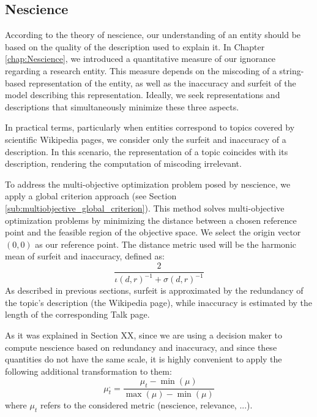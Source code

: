 \subsection{Nescience}

According to the theory of nescience, our understanding of an entity should be based on the quality of the description used to explain it. In Chapter \ref{chap:Nescience}, we introduced a quantitative measure of our ignorance regarding a research entity. This measure depends on the miscoding of a string-based representation of the entity, as well as the inaccuracy and surfeit of the model describing this representation. Ideally, we seek representations and descriptions that simultaneously minimize these three aspects.

In practical terms, particularly when entities correspond to topics covered by scientific Wikipedia pages, we consider only the surfeit and inaccuracy of a description. In this scenario, the representation of a topic coincides with its description, rendering the computation of miscoding irrelevant.

To address the multi-objective optimization problem posed by nescience, we apply a global criterion approach (see Section \ref{sub:multiobjective_global_criterion}). This method solves multi-objective optimization problems by minimizing the distance between a chosen reference point and the feasible region of the objective space. We select the origin vector $(0, 0)$ as our reference point. The distance metric used will be the harmonic mean of surfeit and inaccuracy, defined as:
\[
\frac{2}{ \iota(d, r)^{-1} + \sigma(d, r)^{-1} }
\]
As described in previous sections, surfeit is approximated by the redundancy of the topic's description (the Wikipedia page), while inaccuracy is estimated by the length of the corresponding Talk page.

As it was explained in Section {\color{red} XX}, since we are using a decision maker to compute nescience based on redundancy and inaccuracy, and since these quantities do not have the same scale, it is highly convenient to apply the following additional transformation to them:
\[
\mu_{t}^{,}=\frac{\mu_{t}-\min(\mu)}{\max(\mu)-\min(\mu)}
\]
where $\mu_t$ refers to the considered metric (nescience, relevance, ...). 

